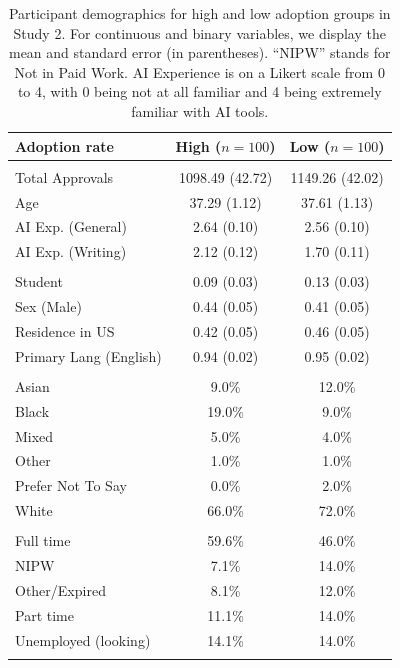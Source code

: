\begin{table}[ht]
\centering
\small
\begin{tabular}{lcc}
\toprule
Adoption rate & High ($n = 100$) & Low ($n=100$) \\
\midrule
\rowcolor{lightgray}\multicolumn{3}{l}{\textit{Continuous variables}} \\
Total Approvals & 1098.49 (42.72) & 1149.26 (42.02) \\
Age & 37.29 (1.12) & 37.61 (1.13) \\
AI Exp. (General) & 2.64 (0.10) & 2.56 (0.10) \\
AI Exp. (Writing) & 2.12 (0.12) & 1.70 (0.11) \\
\addlinespace
\rowcolor{lightgray}\multicolumn{3}{l}{\textit{Binary variables}} \\
Student & 0.09 (0.03) & 0.13 (0.03) \\
Sex (Male) & 0.44 (0.05) & 0.41 (0.05) \\
Residence in US & 0.42 (0.05) & 0.46 (0.05) \\
Primary Lang (English) & 0.94 (0.02) & 0.95 (0.02) \\
\addlinespace
\rowcolor{lightgray}\multicolumn{3}{l}{\textit{Ethnicity}} \\
\quad Asian & 9.0\% & 12.0\% \\
\quad Black & 19.0\% & 9.0\% \\
\quad Mixed & 5.0\% & 4.0\% \\
\quad Other & 1.0\% & 1.0\% \\
\quad Prefer Not To Say & 0.0\% & 2.0\% \\
\quad White & 66.0\% & 72.0\% \\
\addlinespace
\rowcolor{lightgray}\multicolumn{3}{l}{\textit{Employment status}} \\
\quad Full time & 59.6\% & 46.0\% \\
\quad NIPW & 7.1\% & 14.0\% \\
\quad Other/Expired & 8.1\% & 12.0\% \\
\quad Part time & 11.1\% & 14.0\% \\
\quad Unemployed (looking) & 14.1\% & 14.0\% \\
\addlinespace
\bottomrule
\end{tabular}
\caption{Participant demographics for high and low adoption groups in Study 2. For continuous and binary variables, we display the mean and standard error (in parentheses). ``NIPW'' stands for Not in Paid Work. AI Experience is on a Likert scale from 0 to 4, with 0 being not at all familiar and 4 being extremely familiar with AI tools.}
\label{tab:summary_2col_study2}
\end{table}
